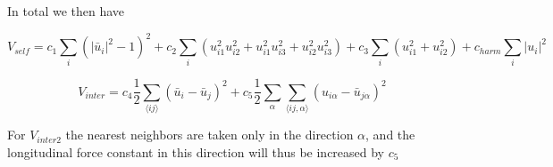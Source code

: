 \documentclass[a4paper, 10pt]{article}
\begin{document}
In total we then have

\begin{equation}
V_{self} =c_1 \sum_i ( |\bar u_i  |^2 -1 )^2 + c_2 \sum_i (  u_{i1}^2 u_{i2}^2 + u_{i1}^2u_{i3}^2 + u_{i2}^2u_{i3}^2 )  + c_3 \sum_i (  u_{i1}^2 + u_{i2}^2 )  + c_{harm} \sum_i  |u_{i} |^2  
\end{equation}

\begin{equation}
V_{inter} = c_4 \frac{1}{2} \sum_{\langle ij \rangle} (\bar u_i -\bar u_j)^2 + c_5 \frac{1}{2} \sum_{\alpha} \sum_{\langle ij, \alpha \rangle} (u_{i\alpha} -\bar u_{j\alpha})^2 
\end{equation}


For $V_{inter2}$ the nearest neighbors are taken only in the direction $\alpha$, and the longitudinal force constant in this direction will thus be increased by $c_5$

\end{document}
